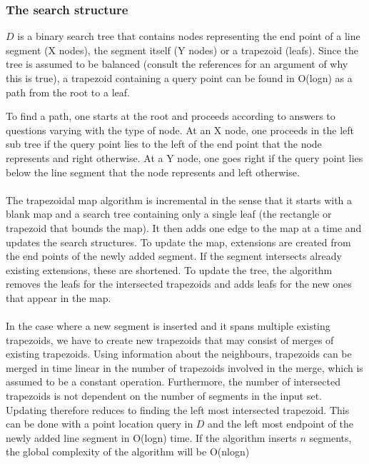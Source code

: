 \subsubsection{The search structure}
$D$ is a binary search tree that contains nodes representing the end point of a line segment (X nodes), the segment itself (Y nodes) or a trapezoid (leafs). Since the tree is assumed to be balanced (consult the references for an argument of why this is true), a trapezoid containing a query point can be found in O(logn) as a path from the root to a leaf. 

To find a path, one starts at the root and proceeds according to answers to questions varying with the type of node. At an X node, one proceeds in the left sub tree if the query point lies to the left of the end point that the node represents and right otherwise. At a Y node, one goes right if the query point lies below the line segment that the node represents and left otherwise.

\paragraph{}
The trapezoidal map algorithm is incremental in the sense that it starts with a blank map and a search tree containing only a single leaf (the rectangle or trapezoid that bounds the map). It then adds one edge to the map at a time and updates the search structures. To update the map, extensions are created from the end points of the newly added segment. If the segment intersects already existing extensions, these are shortened. To update the tree, the algorithm removes the leafs for the intersected trapezoids and adds leafs for the new ones that appear in the map.

\paragraph{}
In the case where a new segment is inserted and it spans multiple existing trapezoids, we have to create new trapezoids that may consist of merges of existing trapezoids. Using information about the neighbours, trapezoids can be merged in time linear in the number of trapezoids involved in the merge, which is assumed to be a constant operation. Furthermore,  the number of intersected trapezoids is not dependent on the number of segments in the input set. Updating therefore reduces to finding the left most intersected trapezoid. This can be done with a point location query in $D$ and the left most endpoint of the newly added line segment in O(logn) time. If the algorithm inserts $n$ segments, the global complexity of the algorithm will be O(nlogn)
